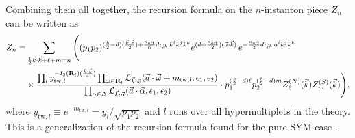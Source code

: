 \documentclass[letterpaper, 11pt]{article}
\newcommand{\nn}{\nonumber}
\def\CL{{\cal L}}
\def\a{\alpha}
\def\e{\epsilon}
\def\k{\kappa}
\def\w{\omega}
\def\D{\Delta}
\begin{document}
Combining them all together, the recursion formula on the $n$-instanton piece $Z_n$ can be written as
\begin{align}
  \label{eq:recursion}
  Z_n = &\sum_{\frac{1}{2}\vec{k}\cdot\vec{k} + \ell + m = n}  
  \Bigg( (p_1p_2)^{(\frac{b}{2} -d) (\frac{\vec{k}\cdot\vec{k}}{2}) +\frac{\k_\text{eff}}{6}d_{ijk}\,k^ik^jk^k} e^{(d+\frac{\k_\text{eff}}{2})(\vec{a}\cdot\vec{k})}\,
 e^{-\frac{\k_\text{eff}}{2}d_{ijk}\,a^ik^jk^k} \\& 
 \times    \frac{\prod_{l} y_{\text{tw}, l}^{-I_2(\mathbf{R}_l)(\frac{\vec{k}\cdot\vec{k}}{4})} \prod_{\w \in \mathbf{R}_l} \CL_{\vec{k}\cdot\vec{\w}}(\vec{a}\cdot \vec{\w} + m_{\text{tw},l}, \e_1,\e_2)}{ \prod_{\a \in \D} \CL_{\vec{k} \cdot \vec{\a}} (\vec{a}\cdot\vec{\alpha}, \epsilon_1, \epsilon_2)}
 \cdot p_1^{(\frac{b}{2}-d)\ell}p_2^{(\frac{b}{2}-d)m}Z^{(N)}_{\ell}(\vec{k})  Z^{(S)}_m (\vec{k}) \Bigg) \nn,
 \end{align}
where $y_{\text{tw},l} \equiv e^{-m_{\text{tw},l}} = y_l / \sqrt{p_1p_2}$ and $l$ runs over all hypermultiplets in the theory. This is a generalization of the recursion formula found for the pure SYM case \cite{Nakajima:2005fg,Gottsche:2006bm}. 
\end{document}
